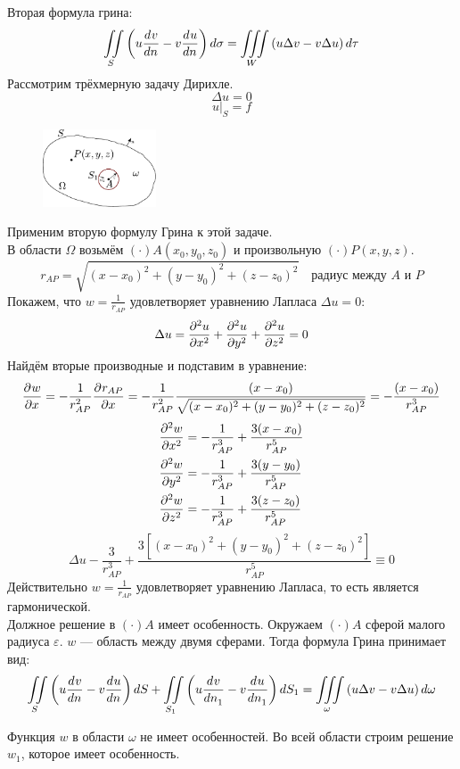 Вторая формула грина:
\[ 
			\iint\limits_S \left(u \frac{d^{}v}{dn^{}} - v \frac{d^{}u}{dn^{}}\right) d\sigma = \iiint\limits_{W} \left(u \Delta v - v \Delta u \right) d \tau
\]
Рассмотрим трёхмерную задачу Дирихле. 
\[
	\Delta u = 0
\]
\[
	u\big|_S = f
\]
\begin{figure}
	\centering
	\includegraphics[width = 0.3\textwidth]{figGreenThreeDim.pdf}
\end{figure}
Применим вторую формулу Грина к этой задаче.\\

В области $\Omega$ возьмём $(\cdot)A(x_0, y_0, z_0)$ и произвольную $(\cdot)P(x, y, z)$.
\[
	r_{AP} = \sqrt{(x - x_0)^2 + (y - y_0)^2 + (z - z_0)^2}\quad \text{радиус между $A$ и $P$}
\]
Покажем, что $w = \frac{1}{r_{AP}}$ удовлетворяет уравнению Лапласа $\Delta u = 0$:
\[
	\Delta u = \frac{\partial^{2}u}{\partial x^{2}} + \frac{\partial^{2}u}{\partial y^{2}} + \frac{\partial^{2}u}{\partial z^{2}} = 0
\]
Найдём вторые производные и подставим в уравнение:
\[
	\frac{\partial^{}w}{\partial x^{}} = - \frac{1}{r_{AP}^2} \frac{\partial^{}r_{AP}}{\partial x^{}} = - \frac{1}{r_{AP}^2} \frac{ (x - x_0)}{  \sqrt{(x - x_0)^2 + (y - y_0)^2 + (z - z_0)^2}} = - \frac{(x - x_0)}{r_{AP}^3}
\]
\begin{align*}
	\frac{\partial^{2}w}{\partial x^{2}} &= - \frac{1}{r_{AP}^3} + \frac{3 (x - x_0)}{r_{AP}^5}\\
	\frac{\partial^{2}w}{\partial y^{2}} &= - \frac{1}{r_{AP}^3} + \frac{3 (y - y_0)}{r_{AP}^5}\\
	\frac{\partial^{2}w}{\partial z^{2}} &= - \frac{1}{r_{AP}^3} + \frac{3 (z - z_0)}{r_{AP}^5}
\end{align*}
\[
	\Delta u - \frac{3}{r_{AP}^3} + \frac{3 [(x - x_0)^2 + (y - y_0)^2 + (z - z_0)^2]}{r_{AP}^5} \equiv 0
\]
Действительно $w = \frac{1}{r_{AP}}$ удовлетворяет уравнению Лапласа, то есть является гармонической.\\[5pt]
Должное решение в $(\cdot)A$ имеет особенность. Окружаем $(\cdot)A$ сферой малого радиуса $\varepsilon$. $w$ --- область между двумя сферами. Тогда формула Грина принимает вид:
\[
	\iint\limits_S \left(u \frac{d^{}v}{dn^{}} - v \frac{d^{}u}{dn^{}}\right) dS + \iint\limits_{S_1} \left(u \frac{d^{}v}{dn_1^{}} - v \frac{d^{}u}{dn_1^{}}\right) dS_1 = \iiint\limits_\omega \left(u \Delta v - v \Delta u \right) d \omega
\]

Функция $w$  в области $\omega$ не имеет особенностей. Во всей области строим решение $w_1$, которое имеет особенность. 

